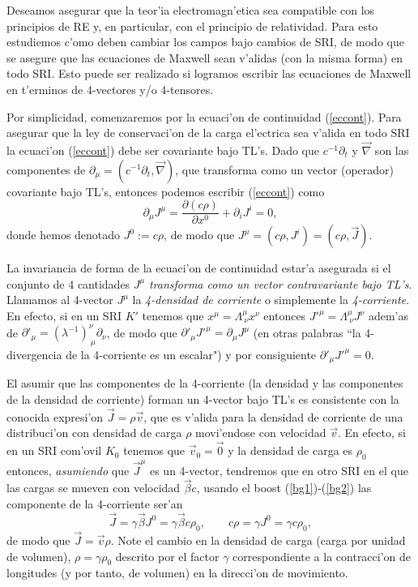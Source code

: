Deseamos asegurar que la teor'ia electromagn'etica sea compatible con los
principios de RE y, en particular, con el principio de relatividad. Para esto
estudiemos c'omo deben cambiar los campos bajo cambios de SRI, de modo que se asegure que las ecuaciones de Maxwell sean v'alidas (con la misma forma) en todo SRI. Esto puede ser realizado si logramos escribir las ecuaciones de Maxwell en t'erminos de 4-vectores y/o 4-tensores.

Por simplicidad, comenzaremos por la ecuaci'on de continuidad (\ref{eccont}). Para asegurar que la ley de conservaci'on de la carga el'ectrica sea v'alida en todo SRI la
ecuaci'on (\ref{eccont}) debe ser covariante bajo TL's.  Dado que
$c^{-1}\partial_t$ y $\vec{\nabla}$ son las componentes de
$\partial_\mu=(c^{-1}\partial_t, \vec\nabla)$, que transforma
como un vector (operador) covariante bajo TL's, entonces podemos escribir
(\ref{eccont}) como
\begin{equation}
\partial_\mu J^\mu=\frac{\partial(c \rho)}{\partial x^0} + \partial_i J^i =0
,\label{dj0}
\end{equation}
donde hemos denotado $J^0:=c \rho $, 
de modo que
$J^\mu =(c \rho,J^i)=(c \rho,\vec{J})$.

La invariancia de forma de la ecuaci'on de continuidad estar'a asegurada si el conjunto de 4 cantidades $J^\mu$ \textit{transforma como un vector contravariante bajo TL's}. Llamamos al 4-vector $J^\mu$ la \textit{4-densidad de corriente} o simplemente la \textit{4-corriente}. En efecto, si en un SRI $K'$ tenemos que $x^\mu=\Lambda^\mu_{\ \nu}x^\nu$ entonces $J'^\mu=\Lambda^\mu_{\ \nu}J^\nu$ adem'as de $\partial'_\mu=(\lambda^{-1})^\nu_{\  \mu}\partial_\nu$, de modo que $\partial'_\mu J'^\mu=\partial_\mu J^\mu$ (en otras palabras ``la 4-divergencia de la 4-corriente es un escalar") y por consiguiente $\partial'_\mu J'^\mu=0$.

El asumir que las componentes de la 4-corriente (la densidad y las componentes de la densidad de corriente) forman un 4-vector bajo TL's es consistente con la conocida expresi'on $\vec{J}=\rho\vec{v}$, que es v'alida para la densidad de corriente de una
distribuci'on con densidad de carga $\rho$ movi'endose con velocidad $\vec{v}$.
En efecto, si en un SRI com'ovil $K_0$ tenemos que $\vec{v}_0=\vec{0}$ y la densidad de carga es $\rho_0$ entonces, \textit{asumiendo} que $\vec{J}^\mu$ es un 4-vector, tendremos que en otro SRI en el que las cargas se mueven con velocidad $\vec\beta c$, usando el boost (\ref{bg1})-(\ref{bg2}) las componente de la 4-corriente ser'an
\begin{equation}
\vec{J}=\gamma\vec\beta J^0=\gamma\vec\beta c \rho_0, \qquad  c\rho=\gamma J^0=\gamma c
\rho_0,
\end{equation}
de modo que $\vec{J}=\vec{v}\rho$. Note el cambio en la densidad de
carga (carga por unidad de volumen), $\rho=\gamma\rho_0$ descrito por el factor $\gamma$ correspondiente a la contracci'on de longitudes (y por tanto, de volumen) en la direcci'on de movimiento.

